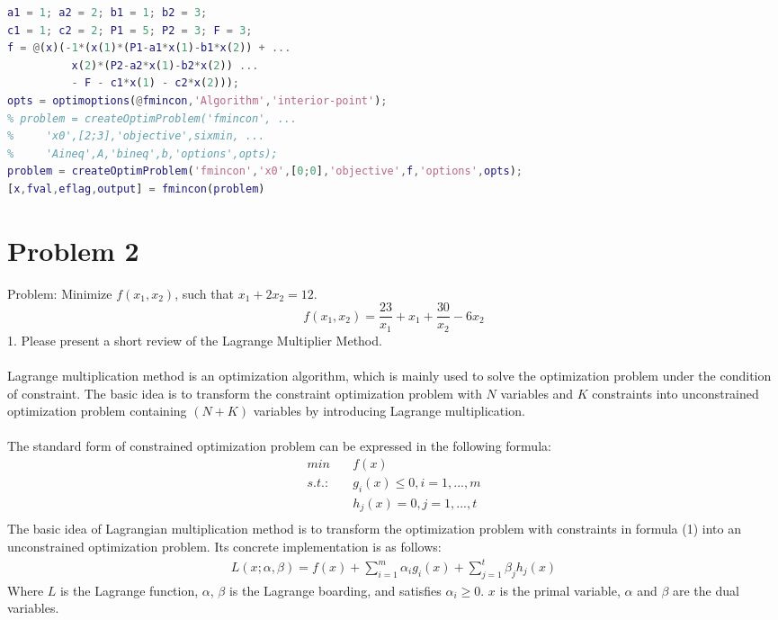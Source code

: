 \documentclass[12pt,a4paper]{article}
\begin{document}
\begin{spacing}{1.5}
\begin{lstlisting}[language=matlab]
a1 = 1; a2 = 2; b1 = 1; b2 = 3;
c1 = 1; c2 = 2; P1 = 5; P2 = 3; F = 3;
f = @(x)(-1*(x(1)*(P1-a1*x(1)-b1*x(2)) + ...
          x(2)*(P2-a2*x(1)-b2*x(2)) ...
          - F - c1*x(1) - c2*x(2)));
opts = optimoptions(@fmincon,'Algorithm','interior-point');
% problem = createOptimProblem('fmincon', ...
%     'x0',[2;3],'objective',sixmin, ...
%     'Aineq',A,'bineq',b,'options',opts);
problem = createOptimProblem('fmincon','x0',[0;0],'objective',f,'options',opts);
[x,fval,eflag,output] = fmincon(problem)
\end{lstlisting}

\newpage
\section{Problem 2}

Problem: Minimize $f(x_1,x_2)$, such that $x_1+2x_2=12$.
\[
f(x_1,x_2) = \frac{23}{x_1} + x_1 + \frac{30}{x_2} - 6x_2
\]
1. Please present a short review of the Lagrange Multiplier Method. \\\\
Lagrange multiplication method is an optimization algorithm, which is mainly used to solve the optimization problem under the condition of constraint. The basic idea is to transform the constraint optimization problem with $N$ variables and $K$ constraints into unconstrained optimization problem containing $(N+K)$ variables by introducing Lagrange multiplication. \\\\
The standard form of constrained optimization problem can be expressed in the following formula:
\begin{equation}
    \begin{aligned}
        min \quad & f(x)\\
        s.t.: \quad & g_i(x) \leq 0, i=1,...,m\\
              \quad & h_j(x) = 0, j=1,...,t\\
    \end{aligned}
\end{equation}
The basic idea of Lagrangian multiplication method is to transform the optimization problem with constraints in formula (1) into an unconstrained optimization problem. Its concrete implementation is as follows:
\begin{equation}
    \begin{aligned}
        L(x;\alpha,\beta) = f(x) + \sum_{i=1}^m \alpha_i g_i(x) + \sum_{j=1}^t \beta_j h_j(x)
    \end{aligned}
\end{equation}
Where $L$ is the Lagrange function, $\alpha$, $\beta$ is the Lagrange boarding, and satisfies ${\alpha}_i \geq 0$. $x$ is the primal variable, $\alpha$ and $\beta$ are the dual variables. 


\end{spacing}
\end{document}
